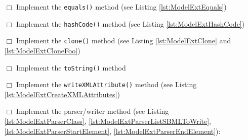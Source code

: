 \begin{itemize}
        \item [$\Box$] Implement the \texttt{equals()} method (see Listing \ref{lst:ModelExtEquals})
        \item [$\Box$] Implement the \texttt{hashCode()} method (see Listing \ref{lst:ModelExtHashCode})
        \item [$\Box$] Implement the \texttt{clone()} method (see Listing \ref{lst:ModelExtClone} and \ref{lst:ModelExtCloneFoo})
        \item [$\Box$] Implement the \texttt{toString()} method
        \item [$\Box$] Implement the \texttt{writeXMLAttribute()} method (see Listing \ref{lst:ModelExtCreateXMLAttributes})
        \item [$\Box$] Implement the parser/writer method (see Listing \ref{lst:ModelExtParserClass}, \ref{lst:ModelExtParserListSBMLToWrite}, \ref{lst:ModelExtParserStartElement}, \ref{lst:ModelExtParserEndElement}):
   \end{itemize}

